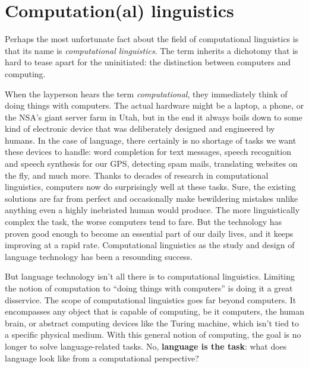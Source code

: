 \chapter{Computation(al) linguistics}
\label{cha:Formal}

Perhaps the most unfortunate fact about the field of computational linguistics is that its name is \emph{computational linguistics}.
The term inherits a dichotomy that is hard to tease apart for the uninitiated: the distinction between computers and computing.

When the layperson hears the term \emph{computational}, they immediately think of doing things with computers.
The actual hardware might be a laptop, a phone, or the NSA's giant server farm in Utah, but in the end it always boils down to some kind of electronic device that was deliberately designed and engineered by humans.
In the case of language, there certainly is no shortage of tasks we want these devices to handle: word completion for text messages, speech recognition and speech synthesis for our GPS, detecting spam mails, translating websites on the fly, and much more.
Thanks to decades of research in computational linguistics, computers now do surprisingly well at these tasks.
Sure, the existing solutions are far from perfect and occasionally make bewildering mistakes unlike anything even a highly inebriated human would produce.
The more linguistically complex the task, the worse computers tend to fare.
But the technology has proven good enough to become an essential part of our daily lives, and it keeps improving at a rapid rate.
Computational linguistics as the study and design of language technology has been a resounding success.

But language technology isn't all there is to computational linguistics.
Limiting the notion of computation to ``doing things with computers'' is doing it a great disservice.
The scope of computational linguistics goes far beyond computers.
It encompasses any object that is capable of computing, be it computers, the human brain, or abstract computing devices like the Turing machine, which isn't tied to a specific physical medium.
With this general notion of computing, the goal is no longer to solve language-related tasks.
No, \textbf{language is the task}: what does language look like from a computational perspective?



